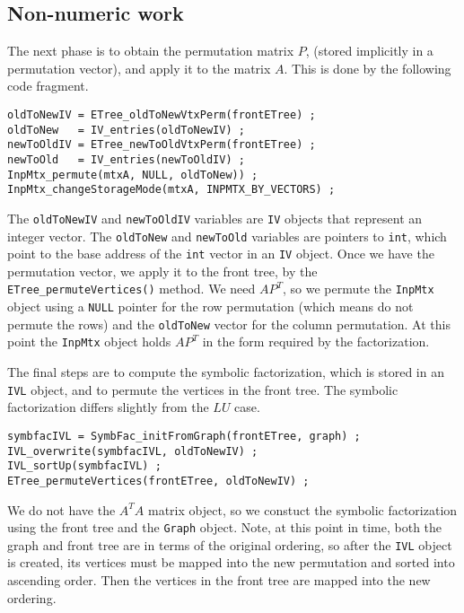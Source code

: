 \subsection{Non-numeric work}
\label{subsection:QR:non-numeric}
\par
The next phase is to obtain the permutation matrix $P$, (stored
implicitly in a permutation vector), and apply it to the matrix $A$.
This is done by the following code fragment.
\begin{verbatim}
oldToNewIV = ETree_oldToNewVtxPerm(frontETree) ;
oldToNew   = IV_entries(oldToNewIV) ;
newToOldIV = ETree_newToOldVtxPerm(frontETree) ;
newToOld   = IV_entries(newToOldIV) ;
InpMtx_permute(mtxA, NULL, oldToNew)) ;
InpMtx_changeStorageMode(mtxA, INPMTX_BY_VECTORS) ;
\end{verbatim}
The {\tt oldToNewIV} and {\tt newToOldIV} variables are {\tt IV}
objects that represent an integer vector.
The {\tt oldToNew} and {\tt newToOld} variables are pointers to
{\tt int}, which point to the base address of the {\tt int} vector
in an {\tt IV} object.
Once we have the permutation vector, we apply it to the front tree,
by the {\tt ETree\_permuteVertices()} method. 
We need $A P^T$, so we permute the {\tt InpMtx}
object using a {\tt NULL} pointer for the row permutation (which
means do not permute the rows) and the {\tt oldToNew} vector for
the column permutation.
At this point the {\tt InpMtx} object holds $AP^T$ in the form
required by the factorization.
\par
The final steps are to compute the symbolic factorization,
which is stored in an {\tt IVL} object, and to permute the vertices
in the front tree.
The symbolic factorization differs slightly from the $LU$ case.
\begin{verbatim}
symbfacIVL = SymbFac_initFromGraph(frontETree, graph) ;
IVL_overwrite(symbfacIVL, oldToNewIV) ;
IVL_sortUp(symbfacIVL) ;
ETree_permuteVertices(frontETree, oldToNewIV) ;
\end{verbatim}
We do not have the $A^TA$ matrix object, so we constuct the
symbolic factorization using the front tree and the {\tt Graph} object.
Note, at this point in time, both the graph and front tree are in
terms of the original ordering, so after the {\tt IVL} object is
created, its vertices must be mapped into the new permutation and
sorted into ascending order.
Then the vertices in the front tree are mapped into the new ordering.
\par
